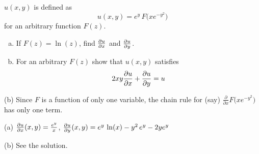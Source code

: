 \begin{question}[M200 2008D] %
$u(x,y)$ is defined as
\begin{equation*}
u(x,y) = e^y\, F\big(xe^{-y^2}\big)
\end{equation*}
for an arbitrary function $F(z)$.

\begin{enumerate}[(a)]
\item
If $F(z) = \ln(z)$, find $\pdiff{u}{x}$ and $\pdiff{u}{y}$.

\item
For an arbitrary $F(z)$ show that $u(x,y)$ satisfies
\begin{equation*}
2xy\pdiff{u}{x} + \pdiff{u}{y} = u
\end{equation*}
\end{enumerate}
\end{question}

\begin{hint}
(b)  Since $F$ is a function of only one variable, the chain rule for (say) $\frac{\partial}{\partial x} F\big(xe^{-y^2}\big)$  has only one term.
\end{hint}

\begin{answer}
(a) $\pdiff{u}{x}(x,y) = \frac{e^y}{x}$,
    $\pdiff{u}{y}(x,y) = e^y\,\ln (x) -y^2\,e^y -2y e^y$

(b) See the solution.
\end{answer}

